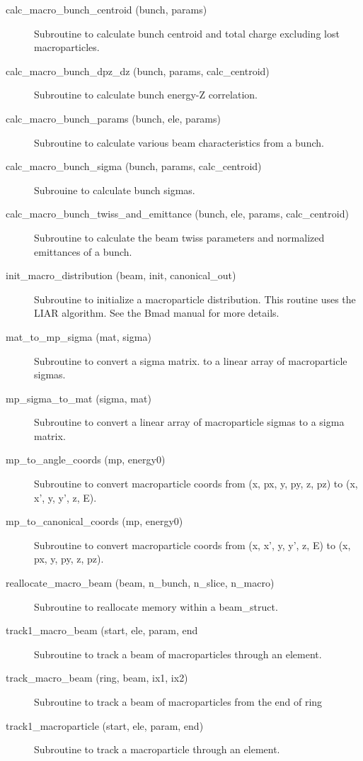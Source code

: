 \begin{description}

\item[calc\_macro\_bunch\_centroid (bunch, params)] \Newline
Subroutine to calculate bunch centroid and total charge excluding lost
macroparticles.

\item[calc\_macro\_bunch\_dpz\_dz (bunch, params, calc\_centroid)] \Newline
Subroutine to calculate bunch energy-Z correlation.

\item[calc\_macro\_bunch\_params (bunch, ele, params)] \Newline
Subroutine to calculate various beam characteristics from a bunch.

\item[calc\_macro\_bunch\_sigma (bunch, params, calc\_centroid)] \Newline
Subrouine to calculate bunch sigmas.

\item[calc\_macro\_bunch\_twiss\_and\_emittance (bunch, ele, params, calc\_centroid)] \Newline 
Subroutine to calculate the beam twiss parameters and normalized emittances of a bunch.

\item[init\_macro\_distribution (beam, init, canonical\_out)] \Newline 
Subroutine to initialize a macroparticle distribution.
This routine uses the LIAR algorithm. See the Bmad manual for more details.

\item[mat\_to\_mp\_sigma (mat, sigma)] \Newline 
Subroutine to convert a sigma matrix. to a linear array of 
macroparticle sigmas.

\item[mp\_sigma\_to\_mat (sigma, mat)] \Newline 
Subroutine to convert a linear array of macroparticle sigmas to a 
sigma matrix. 

\item[mp\_to\_angle\_coords (mp, energy0)] \Newline 
Subroutine to convert macroparticle coords from 
(x, px, y, py, z, pz) to (x, x', y, y', z, E).

\item[mp\_to\_canonical\_coords (mp, energy0)] \Newline 
Subroutine to convert macroparticle coords from 
(x, x', y, y', z, E) to (x, px, y, py, z, pz).

\item[reallocate\_macro\_beam (beam, n\_bunch, n\_slice, n\_macro)] \Newline 
Subroutine to reallocate memory within a beam\_struct.

\item[track1\_macro\_beam (start, ele, param, end] \Newline
Subroutine to track a beam of macroparticles through an element.

\item[track\_macro\_beam (ring, beam, ix1, ix2)] \Newline 
Subroutine to track a beam of macroparticles from the end of
ring%

\item[track1\_macroparticle (start, ele, param, end)] \Newline 
Subroutine to track a macroparticle through an element.


\end{description}

